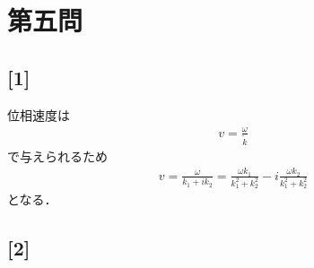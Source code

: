 \documentclass[12pt,dvipdfmx]{jsarticle}
\begin{document}
\section*{\Large{第五問}}
\subsection*{\large{[1]}}
位相速度は
\begin{eqnarray}
  v = \frac{\omega}{\tilde{k}}
\end{eqnarray}
で与えられるため
\begin{eqnarray}
  v = \frac{\omega}{k_1 + ik_2} = \frac{\omega k_1}{k_1^2 + k_2^2} - i\frac{\omega k_2}{k_1^2 + k_2^2}
\end{eqnarray}
となる．
\subsection*{\large{[2]}}
\end{document}
